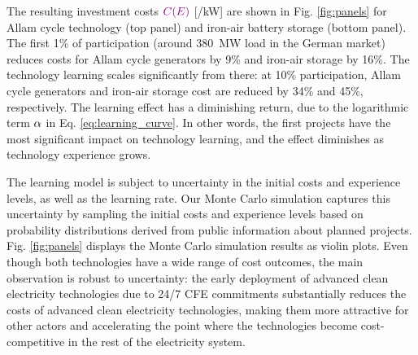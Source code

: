 \documentclass[pdflatex,sn-basic, Numbered]{sn-jnl}
\theoremstyle{thmstyleone}%
\theoremstyle{thmstyletwo}%
\theoremstyle{thmstylethree}%
\begin{document}
The resulting investment costs $\color{violet}C(E)\color{black}$ [\officialeuro/kW] are shown in Fig. \ref{fig:panels} for Allam cycle technology (top panel) and iron-air battery storage (bottom panel).
The first 1\% of participation (around 380~MW load in the German market) reduces costs for Allam cycle generators by 9\% and iron-air storage by 16\%. The technology learning scales significantly from there: at 10\% participation, Allam cycle generators and iron-air storage cost are reduced by 34\% and 45\%, respectively. The learning effect has a diminishing return, due to the logarithmic term $\color{black}\alpha$ in Eq. \ref{eq:learning_curve}. In other words, the first projects have the most significant impact on technology learning, and the effect diminishes as technology experience grows.

The learning model is subject to uncertainty in the initial costs and experience levels, as well as the learning rate. Our Monte Carlo simulation captures this uncertainty by sampling the initial costs and experience levels based on probability distributions derived from public information about planned projects. Fig. \ref{fig:panels} displays the Monte Carlo simulation results as violin plots. Even though both technologies have a wide range of cost outcomes, the main observation is robust to uncertainty: the early deployment of advanced clean electricity technologies due to 24/7 CFE commitments substantially reduces the costs of advanced clean electricity technologies, making them more attractive for other actors and accelerating the point where the technologies become cost-competitive in the rest of the electricity system.
\end{document}
